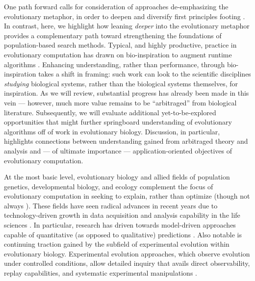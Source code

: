 One path forward calls for consideration of approaches de-emphasizing the evolutionary metaphor, in order to deepen and diversify first principles footing \citep{moore2023evolution}.
In contrast, here, we highlight how leaning \textit{deeper} into the evolutionary metaphor provides a complementary path toward strengthening the foundations of population-based search methods.
Typical, and highly productive, practice in evolutionary computation has drawn on bio-inspiration to augment runtime algorithms \citep{banzhaf2006artificial,kumar2003biologically,mcphee2009developmental}.
Enhancing understanding, rather than performance, through bio-inspiration takes a shift in framing: such work can look to the scientific disciplines \textit{studying} biological systems, rather than the biological systems themselves, for inspiration.
As we will review, substantial progress has already been made in this vein --- however, much more value remains to be ``arbitraged'' from biological literature.
Subsequently, we will evaluate additional yet-to-be-explored opportunities that might further springboard understanding of evolutionary algorithms off of work in evolutionary biology.
Discussion, in particular, highlights connections between understanding gained from arbitraged theory and analysis and --- of ultimate importance --- application-oriented objectives of evolutionary computation.

At the most basic level, evolutionary biology and allied fields of population genetics, developmental biology, and ecology complement the focus of evolutionary computation in seeking to explain, rather than optimize (though not always \citep{cobb2013directed,carroll2014applying}).
These fields have seen radical advances in recent years due to technology-driven growth in data acquisition and analysis capability in the life sciences \citep{TODO}.
In particular, research has driven towards model-driven approaches capable of quantitative (as opposed to qualitative) predictions \citep{TODO}.
Also notable is continuing traction gained by the subfield of experimental evolution within evolutionary biology.
Experimental evolution approaches, which observe evolution under controlled conditions, allow detailed inquiry that avails direct observability, replay capabilities, and systematic experimental manipulations \citep{kawecki2012experimental}.

